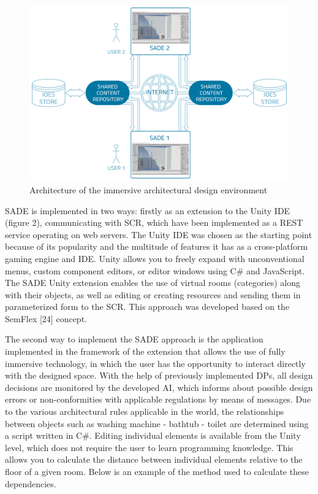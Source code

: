 \documentclass[runningheads]{llncs}
\begin{document}
\begin{figure}[H]
\centering
\includegraphics[width=\textwidth]{graf2.png}
\caption{Architecture of the immersive architectural design environment} \label{fig2}
\end{figure}
SADE is implemented in two ways: firstly as an extension to the Unity IDE (figure 2), communicating with SCR, which have been implemented as a REST service operating on web servers. The Unity IDE was chosen as the starting point because of its popularity and the multitude of features it has as a cross-platform gaming engine and IDE. Unity allows you to freely expand with unconventional menus, custom component editors, or editor windows using C\# and JavaScript. The SADE Unity extension enables the use of virtual rooms (categories) along with their objects, as well as editing or creating resources and sending them in parameterized form to the SCR. This approach was developed based on the SemFlex [24] concept.

The second way to implement the SADE approach is the application implemented in the framework of the extension that allows the use of fully immersive technology, in which the user has the opportunity to interact directly with the designed space. With the help of previously implemented DPs, all design decisions are monitored by the developed AI, which informs about possible design errors or non-conformities with applicable regulations by means of messages.
Due to the various architectural rules applicable in the world, the relationships between objects such as washing machine - bathtub - toilet are determined using a script written in C\#. Editing individual elements is available from the Unity level, which does not require the user to learn programming knowledge. This allows you to calculate the distance between individual elements relative to the floor of a given room. Below is an example of the method used to calculate these dependencies. 
\end{document}
